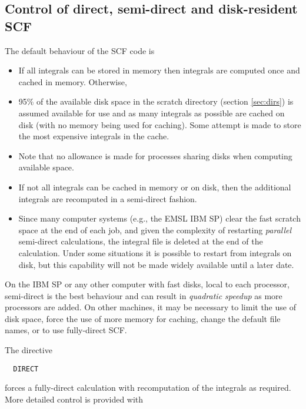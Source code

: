 \subsection{Control of direct, semi-direct and disk-resident SCF}
\label{sec:semidirect}

The default behaviour of the SCF code is
\begin{itemize}
\item If all integrals can be stored in memory then integrals are
  computed once and cached in memory. Otherwise,
\item 95\% of the available disk space in the scratch directory
  (section \ref{sec:dirs}) is assumed available for use
  and as many integrals as possible are cached on disk (with no
  memory being used for caching).  Some attempt is made to 
  store the most expensive integrals in the cache.
\item Note that no allowance is made for processes sharing
  disks when computing available space.
\item If not all integrals can be cached in memory or on disk,
  then the additional integrals are recomputed in a semi-direct
  fashion.
\item Since many computer systems (e.g., the EMSL IBM SP) clear the
  fast scratch space at the end of each job, and given the complexity
  of restarting {\em parallel} semi-direct calculations, the integral
  file is deleted at the end of the calculation.  Under some
  situations it is possible to restart from integrals on disk, but
  this capability will not be made widely available until a later date.
\end{itemize}

On the IBM SP or any other computer with fast disks, local to each
processor, semi-direct is the best behaviour and can result in {\em
  quadratic speedup} as more processors are added.  On other machines,
it may be necessary to limit the use of disk space, force the use of
more memory for caching, change the default file names, or to use
fully-direct SCF.

The directive
\begin{verbatim}
  DIRECT
\end{verbatim}
forces a fully-direct calculation with recomputation of the integrals
as required.  More detailed control is provided with


